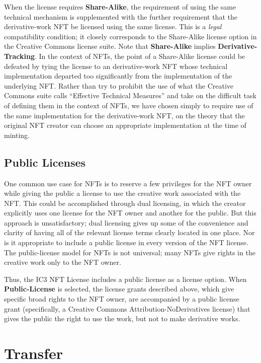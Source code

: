 \documentclass{article}
\newcommand{\keyword}[1]{\textbf{#1}\xspace}
\newcommand{\publiclicense}{\keyword{Public-License}}
\newcommand{\sharealike}{\keyword{Share-Alike}}
\newcommand{\derivativetracking}{\keyword{Derivative-Tracking}}
\begin{document}
When the license requires \sharealike, the requirement of using the same technical mechanism is supplemented with the further requirement that the derivative-work NFT be licensed using the same license. This is a \emph{legal} compatibility condition; it closely corresponds to the Share-Alike license option in the Creative Commons license suite. Note that \sharealike implies \derivativetracking. In the context of NFTs, the point of a Share-Alike license could be defeated by tying the license to an derivative-work NFT whose technical implementation departed too significantly from the implementation of the underlying NFT. Rather than try to prohibit the use of what the Creative Commons suite calls ``Effective Technical Measures'' and take on the difficult task of defining them in the context of NFTs, we have chosen simply to require use of the same implementation for the derivative-work NFT, on the theory that the original NFT creator can choose an appropriate implementation at the time of minting.

\subsection{Public Licenses}

One common use case for NFTs is to reserve a few privileges for the NFT owner while giving the public a license to use the creative work associated with the NFT. This could be accomplished through dual licensing, in which the creator explicitly uses one license for the NFT owner and another for the public. But this approach is unsatisfactory; dual licensing gives up some of the convenience and clarity of having all of the relevant license terms clearly located in one place. Nor is it appropriate to include a public license in every version of the NFT license. The public-license model for NFTs is not universal; many NFTs give rights in the creative work only to the NFT owner.

Thus, the IC3 NFT License includes a public license as a license option. When \publiclicense is selected, the license grants described above, which give specific broad rights to the NFT owner, are accompanied by a public license grant (specifically, a Creative Commons Attribution-NoDerivatives license) that gives the public the right to use the work, but not to make derivative works.



\section{Transfer}
\label{sec:trans}
\end{document}
